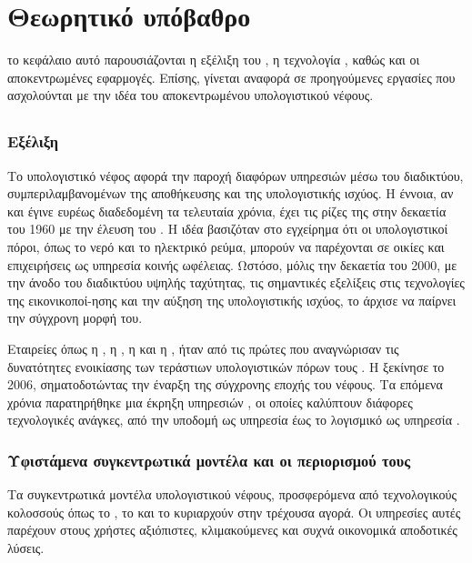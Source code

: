 \chapter{Θεωρητικό υπόβαθρο}
το κεφάλαιο αυτό παρουσιάζονται η εξέλιξη του 
, η τεχνολογία , καθώς και οι
αποκεντρωμένες εφαρμογές. Επίσης, γίνεται αναφορά σε προηγούμενες εργασίες 
που ασχολούνται με την ιδέα του αποκεντρωμένου υπολογιστικού νέφους.

\section{}
\subsection{Εξέλιξη }
Το υπολογιστικό νέφος αφορά την παροχή διαφόρων υπηρεσιών μέσω του 
διαδικτύου, συμπεριλαμβανομένων της αποθήκευσης και της υπολογιστικής ισχύος. 
Η έννοια, αν και έγινε ευρέως διαδεδομένη τα τελευταία χρόνια, έχει τις ρίζες 
της στην δεκαετία του 1960 με την έλευση του . Η ιδέα 
βασιζόταν στο εγχείρημα ότι οι υπολογιστικοί πόροι, όπως το νερό και το 
ηλεκτρικό ρεύμα, μπορούν να παρέχονται σε οικίες και επιχειρήσεις ως υπηρεσία 
κοινής ωφέλειας. Ωστόσο, μόλις την δεκαετία του 2000, με την άνοδο του 
διαδικτύου υψηλής ταχύτητας, τις σημαντικές εξελίξεις στις τεχνολογίες
της εικονικοποί-ησης  και την αύξηση της υπολογιστικής ισχύος, 
το  άρχισε να παίρνει την σύγχρονη μορφή του. 

Εταιρείες όπως η , η , η  και η , ήταν από τις 
πρώτες που αναγνώρισαν τις δυνατότητες ενοικίασης των τεράστιων υπολογιστικών 
πόρων τους \cite{ref1} . Η  ξεκίνησε το 2006, σηματοδοτώντας 
την έναρξη της σύγχρονης εποχής του νέφους. Τα επόμενα χρόνια παρατηρήθηκε 
μια έκρηξη υπηρεσιών  \cite{ref2}, οι οποίες καλύπτουν διάφορες τεχνολογικές ανάγκες, 
από την υποδομή ως υπηρεσία  έως το 
λογισμικό ως υπηρεσία .

\subsection{Υφιστάμενα συγκεντρωτικά μοντέλα και οι περιορισμού τους}
Τα συγκεντρωτικά μοντέλα υπολογιστικού νέφους, προσφερόμενα από τεχνολογικούς 
κολοσσούς όπως το , το  και το 
κυριαρχούν στην τρέχουσα αγορά. Οι υπηρεσίες αυτές παρέχουν στους χρήστες 
αξιόπιστες, κλιμακούμενες και συχνά οικονομικά αποδοτικές λύσεις. 

